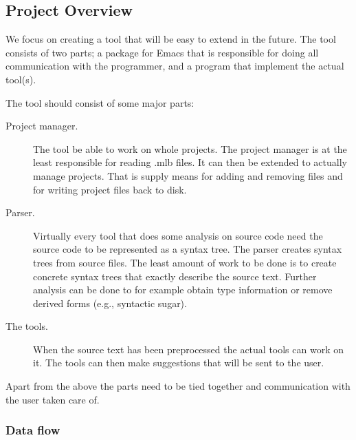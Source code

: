 \documentclass[a4paper,oneside]{memoir}
\begin{document}


\subsection{Project Overview}

We focus on creating a tool that will be easy to extend in the
future. The tool consists of two parts; a package for Emacs that is
responsible for doing all communication with the programmer, and a
program that implement the actual tool(s).

The tool should consist of some major parts:
\begin{description}
\item[Project manager.] The tool be able to work on whole
  projects. The project manager is at the least responsible for
  reading .mlb files. It can then be extended to actually manage
  projects. That is supply means for adding and removing files and for
  writing project files back to disk.
\item[Parser.] Virtually every tool that does some analysis on source
  code need the source code to be represented as a syntax tree. The
  parser creates syntax trees from source files. The least amount of
  work to be done is to create concrete syntax trees that exactly
  describe the source text. Further analysis can be done to for
  example obtain type information or remove derived forms (e.g.,
  syntactic sugar).
\item[The tools.] When the source text has been preprocessed the
  actual tools can work on it. The tools can then make suggestions
  that will be sent to the user.
\end{description}

Apart from the above the parts need to be tied together and
communication with the user taken care of.


\subsubsection{Data flow}
\end{document}
